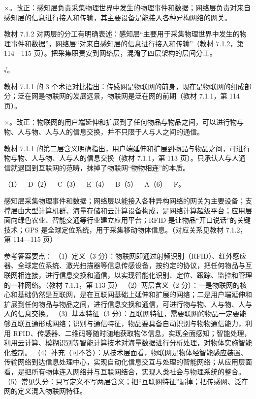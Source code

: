 \documentclass[a4paper,11pt]{article}
\begin{document}
\q ×。改正：感知层负责采集物理世界中发生的物理事件和数据；网络层负责对来自感知层的信息进行接入和传输，其主要设备是能接入各种异构网络的网关。\begin{analysis}教材 7.1.2 对两层的分工有明确表述：感知层“主要用于采集物理世界中发生的物理事件和数据”，网络层“对来自感知层的信息进行接入和传输”（教材 7.1.2，第 114—115 页）。把采集职责安到网络层，混淆了四层架构的层间分工。\end{analysis}

\q √。\begin{analysis}教材 7.1.1 的 3 个术语对比指出：传感网是物联网的前身，现在是物联网的组成部分；泛在网是物联网的发展远景，物联网是泛在网的前期（教材 7.1.1，第 114 页）。\end{analysis}

\q ×。改正：物联网的用户端延伸和扩展到了任何物品与物品之间，可以进行物与物、人与物、人与人的信息交换，并不只限于人与人之间的通信。\begin{analysis}教材 7.1.1 的第二层含义明确指出，用户端延伸和扩展到物品与物品之间，可进行物与物、人与物、人与人的信息交换（教材 7.1.1，第 113 页）。只承认人与人通信就退回到互联网的范畴，抹掉了物联网“物物相连”的本质。\end{analysis}


\q （1）—D\quad （2）—C\quad （3）—E\quad （4）—B\quad （5）—A\quad （6）—F。
\begin{analysis}感知层采集物理事件和数据；网络层以能接入各种异构网络的网关为主要设备；支撑层由大型计算机群、海量存储和云计算设备构成，是网络计算超级平台；应用层面向绿色农业、智能交通等行业建立应用平台；RFID 是让物品“开口说话”的关键技术；GPS 是全球定位系统，用于采集移动物体信息。（对应关系见教材 7.1.2，第 114—115 页）\end{analysis}


\q 参考答案要点：
（1）定义（3 分）：物联网即通过射频识别（RFID）、红外感应器、全球定位系统、激光扫描器等信息传感设备，按约定的协议，把任何物品与互联网相连接，进行信息交换和通信，以实现智能化识别、定位、跟踪、监控和管理的一种网络。（教材 7.1.1，第 113 页）
（2）两层含义（2 分）：一是物联网的核心和基础仍然是互联网，是在互联网基础上延伸和扩展的网络；二是用户端延伸和扩展到任何物品与物品之间，进行信息交换和通信，可进行物与物、人与物、人与人的信息交换。
（3）基本特征（3 分）：互联网特征，需要联网的物品一定要能够互联互通形成网络；识别与通信特征，物品要具备自动识别与物物通信能力，利用 RFID、传感器、二维码等随时随地获取物体信息，实现全面感知；智能处理，利用云计算、模糊识别等智能计算技术对海量数据进行分析处理，对物体实施智能化控制。
（4）补充（可不答）：从技术层面看，物联网是物体经智能感应装置、传输网络到达信息处理中心，实现自动化信息交互与处理的智能网络；从应用层面看，是把所有物体连入网络并与互联网结合，实现人类社会与物理系统的整合。
（5）常见失分：只写定义不写两层含义；把“互联网特征”漏掉；把传感网、泛在网的定义混入物联网特征。
\end{document}
